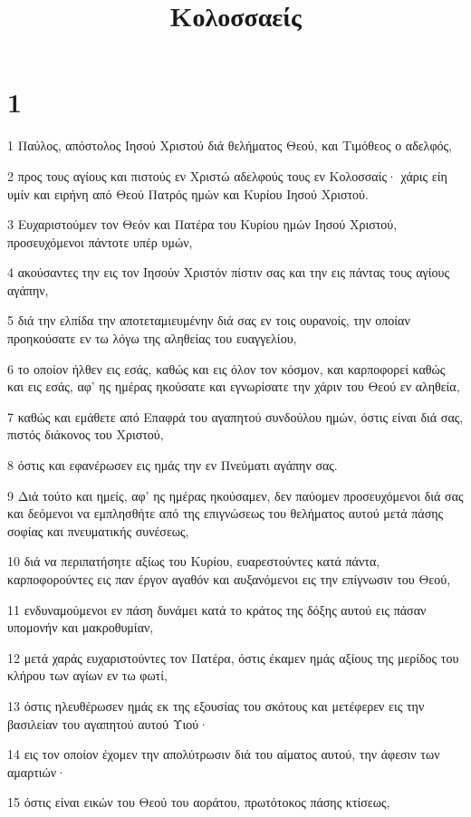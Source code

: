 

\title{Κολοσσαείς}


\chapter{1}

\par 1 Παύλος, απόστολος Ιησού Χριστού διά θελήματος Θεού, και Τιμόθεος ο αδελφός,
\par 2 προς τους αγίους και πιστούς εν Χριστώ αδελφούς τους εν Κολοσσαίς· χάρις είη υμίν και ειρήνη από Θεού Πατρός ημών και Κυρίου Ιησού Χριστού.
\par 3 Ευχαριστούμεν τον Θεόν και Πατέρα του Κυρίου ημών Ιησού Χριστού, προσευχόμενοι πάντοτε υπέρ υμών,
\par 4 ακούσαντες την εις τον Ιησούν Χριστόν πίστιν σας και την εις πάντας τους αγίους αγάπην,
\par 5 διά την ελπίδα την αποτεταμιευμένην διά σας εν τοις ουρανοίς, την οποίαν προηκούσατε εν τω λόγω της αληθείας του ευαγγελίου,
\par 6 το οποίον ήλθεν εις εσάς, καθώς και εις όλον τον κόσμον, και καρποφορεί καθώς και εις εσάς, αφ' ης ημέρας ηκούσατε και εγνωρίσατε την χάριν του Θεού εν αληθεία,
\par 7 καθώς και εμάθετε από Επαφρά του αγαπητού συνδούλου ημών, όστις είναι διά σας, πιστός διάκονος του Χριστού,
\par 8 όστις και εφανέρωσεν εις ημάς την εν Πνεύματι αγάπην σας.
\par 9 Διά τούτο και ημείς, αφ' ης ημέρας ηκούσαμεν, δεν παύομεν προσευχόμενοι διά σας και δεόμενοι να εμπλησθήτε από της επιγνώσεως του θελήματος αυτού μετά πάσης σοφίας και πνευματικής συνέσεως,
\par 10 διά να περιπατήσητε αξίως του Κυρίου, ευαρεστούντες κατά πάντα, καρποφορούντες εις παν έργον αγαθόν και αυξανόμενοι εις την επίγνωσιν του Θεού,
\par 11 ενδυναμούμενοι εν πάση δυνάμει κατά το κράτος της δόξης αυτού εις πάσαν υπομονήν και μακροθυμίαν,
\par 12 μετά χαράς ευχαριστούντες τον Πατέρα, όστις έκαμεν ημάς αξίους της μερίδος του κλήρου των αγίων εν τω φωτί,
\par 13 όστις ηλευθέρωσεν ημάς εκ της εξουσίας του σκότους και μετέφερεν εις την βασιλείαν του αγαπητού αυτού Υιού·
\par 14 εις τον οποίον έχομεν την απολύτρωσιν διά του αίματος αυτού, την άφεσιν των αμαρτιών·
\par 15 όστις είναι εικών του Θεού του αοράτου, πρωτότοκος πάσης κτίσεως,
